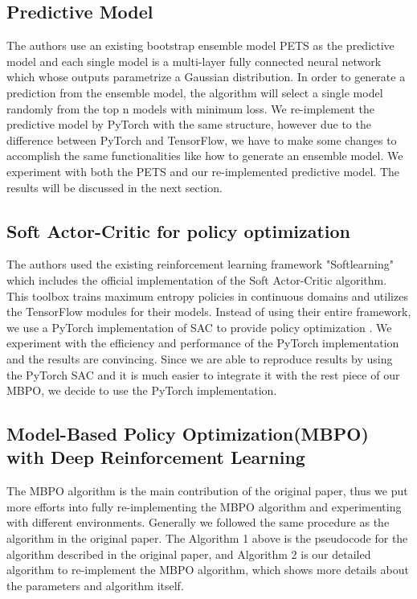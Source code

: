 \subsection{Predictive Model}
The authors use an existing bootstrap ensemble model PETS as the predictive model and each single model is a multi-layer fully connected neural network which whose outputs parametrize a Gaussian distribution. In order to generate a prediction from the ensemble model, the algorithm will select a single model randomly from the top n models with minimum loss. We re-implement the predictive model by PyTorch with the same structure, however due to the difference between PyTorch and TensorFlow, we have to make some changes to accomplish the same functionalities like how to generate an ensemble model. We experiment with both the PETS and our re-implemented predictive model. The results will be discussed in the next section.

\subsection{Soft Actor-Critic for policy optimization}
The authors used the existing reinforcement learning framework "Softlearning" which includes the official implementation of the Soft Actor-Critic algorithm. This toolbox trains maximum entropy policies in continuous domains and utilizes the TensorFlow modules for their models. Instead of using their entire framework, we use a PyTorch implementation of SAC to provide policy optimization \cite{ref9}. We experiment with the efficiency and performance of the PyTorch implementation and the results are convincing. Since we are able to reproduce results by using the PyTorch SAC and it is much easier to integrate it with the rest piece of our MBPO, we decide to use the PyTorch implementation.

\subsection{Model-Based Policy Optimization(MBPO) with Deep Reinforcement Learning}

The MBPO algorithm is the main contribution of the original paper, thus we put more efforts into fully re-implementing the MBPO algorithm and experimenting with different environments. Generally we followed the same procedure as the algorithm in the original paper. The Algorithm 1 above is the pseudocode for the algorithm described in the original paper, and Algorithm 2 is our detailed algorithm to re-implement the MBPO algorithm, which shows more details about the parameters and algorithm itself. 

